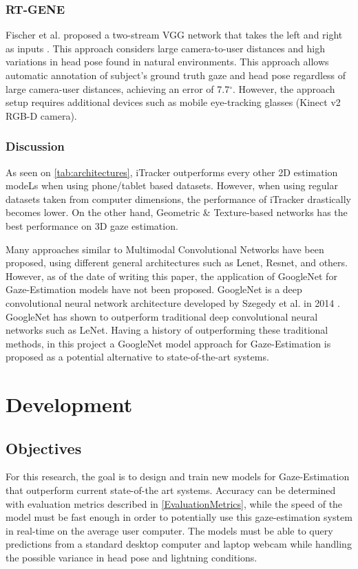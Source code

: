 \subsection{RT-GENE}
Fischer et al. proposed a two-stream VGG network that takes the left and right as inputs \cite{fischer_rt-gene_2018}. This approach considers large camera-to-user distances and high variations in head pose found in natural environments. This approach allows automatic annotation of subject's ground truth gaze and head pose regardless of large camera-user distances, achieving an error of 7.7$^{\circ}$. However, the approach setup requires additional devices such as mobile eye-tracking glasses (Kinect v2 RGB-D camera).

\subsection{Discussion}
As seen on \autoref{tab:architectures}, iTracker outperforms every other 2D estimation modeLs when using phone/tablet based datasets. However, when using regular datasets
 taken from computer dimensions, the performance of iTracker drastically becomes lower. On the other hand, Geometric \& Texture-based
networks has the best performance on 3D gaze estimation. 

Many approaches similar to Multimodal Convolutional Networks have been proposed, using different general architectures such as Lenet, Resnet, and others. However,
as of the date of writing this paper, the application of GoogleNet for Gaze-Estimation models have not been proposed. GoogleNet is a deep convolutional
neural network architecture developed by Szegedy et al. in 2014 \cite{going_deeper_googlenet}. GoogleNet has shown to outperform traditional deep convolutional neural networks such as LeNet.
Having a history of outperforming these traditional methods, in this project a GoogleNet model approach for Gaze-Estimation is proposed as a potential alternative to state-of-the-art systems.

\chapter{Development}
\label{Chap3}


\section{Objectives}
For this research, the goal is to design and train new models for Gaze-Estimation that outperform current state-of-the art systems. 
Accuracy can be determined with evaluation metrics described in \autoref{EvaluationMetrics}, while the speed of the model
must be fast enough in order to potentially use this gaze-estimation system in real-time on the average user computer. The
models must be able to query predictions from a standard desktop computer and laptop webcam while handling the possible variance in head pose
and lightning conditions.


